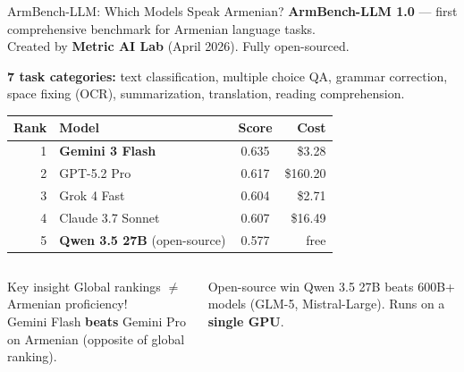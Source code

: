 \documentclass[aspectratio=169]{beamer}
\begin{document}
\begin{frame}{ArmBench-LLM: Which Models Speak Armenian?}
\small
\textbf{\color{popblue}ArmBench-LLM 1.0} --- first comprehensive benchmark for Armenian language tasks.\\
Created by \textbf{Metric AI Lab} (April 2026). Fully open-sourced.

\smallskip
\textbf{7 task categories:}
text classification, multiple choice QA, grammar correction, space fixing (OCR),
summarization, translation, reading comprehension.

\smallskip
\begin{center}
\footnotesize
\begin{tabular}{@{}r l c r@{}}
\toprule
\textbf{Rank} & \textbf{Model} & \textbf{Score} & \textbf{Cost} \\
\midrule
1 & \textbf{\color{paramgreen}Gemini 3 Flash} & 0.635 & \$3.28 \\
2 & GPT-5.2 Pro & 0.617 & \$160.20 \\
3 & Grok 4 Fast & 0.604 & \$2.71 \\
4 & Claude 3.7 Sonnet & 0.607 & \$16.49 \\
5 & \textbf{\color{violet1}Qwen 3.5 27B} {\scriptsize(open-source)} & 0.577 & free \\
\bottomrule
\end{tabular}
\end{center}

\smallskip
\begin{columns}[T]
\begin{exampleblock}{Key insight}
Global rankings $\neq$ Armenian proficiency!\\
Gemini Flash \textbf{beats} Gemini Pro on Armenian (opposite of global ranking).
\end{exampleblock}

\begin{exampleblock}{Open-source win}
Qwen 3.5 27B beats 600B+ models (GLM-5, Mistral-Large). Runs on a \textbf{single GPU}.
\end{exampleblock}
\end{columns}
\end{frame}
\end{document}
